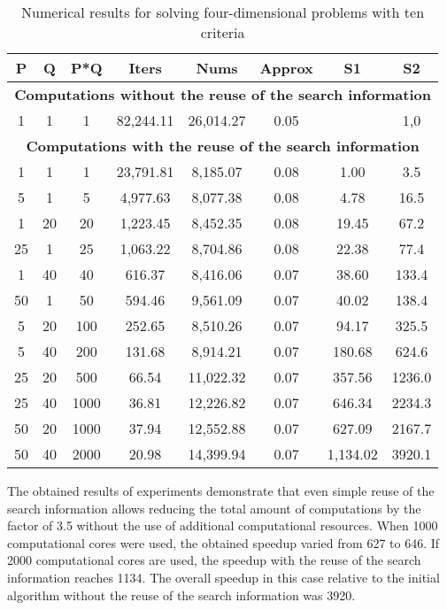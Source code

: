 \documentclass[runningheads]{llncs}
\begin{document}
\begin{table}[ht]
\centering
\caption{Numerical results for solving four-dimensional problems with ten criteria}
\label{tab:01}
\begin{tabular}{cccccccc}
\hline
P     & Q     & P*Q    & Iters       & Nums        & Approx   & S1         & S2       \\ \hline
\multicolumn{8}{c}{\textbf{Computations without the reuse of the search information}} \\ \hline
1     & 1     & 1      & 82,244.11   & 26,014.27   & 0.05     &            & 1,0      \\ \hline
\multicolumn{8}{c}{\textbf{Computations with the reuse of the search information}}    \\ \hline
1     & 1     & 1      & 23,791.81   & 8,185.07    & 0.08     & 1.00       & 3.5      \\
5     & 1     & 5      & 4,977.63    & 8,077.38    & 0.08     & 4.78       & 16.5     \\
1     & 20    & 20     & 1,223.45    & 8,452.35    & 0.08     & 19.45      & 67.2     \\
25    & 1     & 25     & 1,063.22    & 8,704.86    & 0.08     & 22.38      & 77.4     \\
1     & 40    & 40     & 616.37      & 8,416.06    & 0.07     & 38.60      & 133.4    \\
50    & 1     & 50     & 594.46      & 9,561.09    & 0.07     & 40.02      & 138.4    \\
5     & 20    & 100    & 252.65      & 8,510.26    & 0.07     & 94.17      & 325.5    \\
5     & 40    & 200    & 131.68      & 8,914.21    & 0.07     & 180.68     & 624.6    \\
25    & 20    & 500    & 66.54       & 11,022.32   & 0.07     & 357.56     & 1236.0   \\
25    & 40    & 1000   & 36.81       & 12,226.82   & 0.07     & 646.34     & 2234.3   \\
50    & 20    & 1000   & 37.94       & 12,552.88   & 0.07     & 627.09     & 2167.7   \\
50    & 40    & 2000   & 20.98       & 14,399.94   & 0.07     & 1,134.02   & 3920.1   \\ \hline
\end{tabular}
\end{table}

The obtained results of experiments demonstrate that even simple reuse of the search information allows reducing the total amount of computations by the factor of 3.5 without the use of additional computational resources. When 1000 computational cores were used, the obtained speedup varied from 627 to 646. If 2000 computational cores are used, the speedup with the reuse of the search information reaches 1134. The overall speedup in this case relative to the initial algorithm without the reuse of the search information was 3920.
\end{document}
